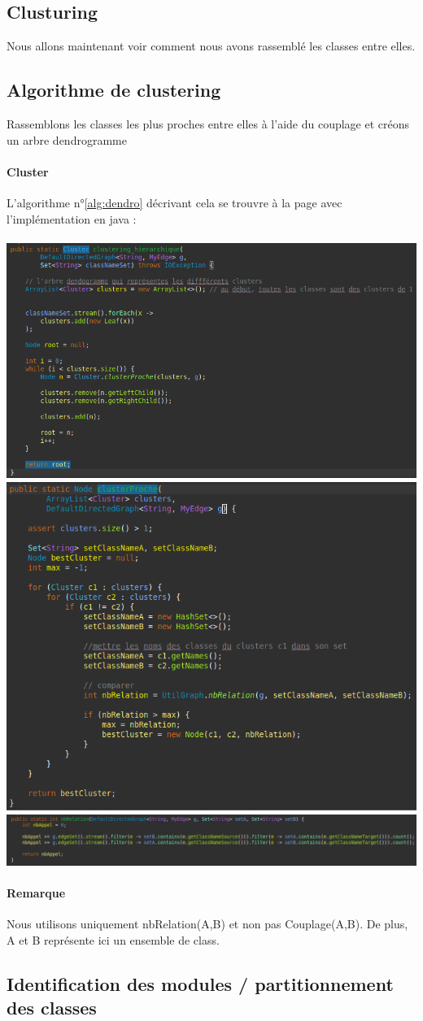 \documentclass[a4paper]{article}
\begin{document}
\begin{multicols}{2}
        \section{Clusturing}
        Nous allons maintenant voir comment nous avons rassemblé les classes entre elles. 
        \subsection{Algorithme de clustering}
        Rassemblons les classes les plus proches entre elles à l'aide du couplage et créons un arbre dendrogramme
        \paragraph{Cluster} L'algorithme n°\ref{alg:dendro} décrivant cela se trouvre à la page \pageref{alg:dendro} avec l'implémentation en java :
        \\\\
        \noindent\includegraphics[width=.46\textwidth]{cluster/codeA}
        \noindent\includegraphics[width=.46\textwidth]{cluster/codeB}
        \noindent\includegraphics[width=.46\textwidth]{cluster/codeC}

        \paragraph{Remarque} Nous utilisons uniquement nbRelation(A,B) et non pas Couplage(A,B). De plus, A et B représente ici un ensemble de class.
        \subsection{Identification des modules / partitionnement des classes}


\end{multicols}
\end{document}
